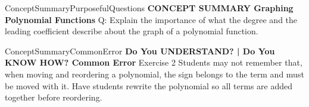 \documentclass{article}
\newenvironment{te-addendum}[2]{}{}     %
\newcommand{\answer}[1]{}               %
\newcommand{\te}[1]{}                   %
\begin{document}
\begin{te-addendum}{ConceptSummary}{PurposefulQuestions}
\textbf{CONCEPT SUMMARY Graphing Polynomial Functions}
Q: Explain the importance of what the degree and the leading coefficient describe about the graph of a polynomial function.
\answer{The degree tells if the y-values will have the same signs or different signs as x-values approach negative infinity and positive infinity. The leading coefficient determines what the signs will be as the graph goes from left to right.}
\te{Concept Summary, Do You Understand, and Do You Know How are available at SavvasRealize.com. Presentation. Practice.}
\end{te-addendum}
\begin{te-addendum}{ConceptSummary}{CommonError}
\textbf{Do You UNDERSTAND? | Do You KNOW HOW? Common Error}
Exercise 2 Students may not remember that, when moving and reordering a polynomial, the sign belongs to the term and must be moved with it. Have students rewrite the polynomial so all terms are added together before reordering.
\end{te-addendum}
\end{document}
